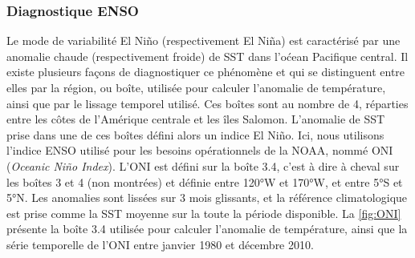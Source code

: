 \documentclass[../main.tex]{subfiles}
\begin{document}


\subsubsection{Diagnostique ENSO}\label{sec:diag_enso}

Le mode de variabilité El Niño (respectivement El Niña) est caractérisé par une anomalie chaude (respectivement froide) de SST dans l'oćean Pacifique central.
Il existe plusieurs façons de diagnostiquer ce phénomène et qui se distinguent entre elles par la région, ou boîte, utilisée pour calculer l'anomalie de
température, ainsi que par le lissage temporel utilisé. Ces boîtes sont au nombre de \num{4}, réparties entre les côtes de l'Amérique centrale et les îles
Salomon. L'anomalie de SST prise dans une de ces boîtes défini alors un indice El Niño. Ici, nous utilisons l'indice ENSO utilisé pour les besoins
opérationnels de la NOAA, nommé ONI (\textit{Oceanic Niño Index}). L'ONI est défini sur la boîte 3.4, c'est à dire à cheval sur les boîtes \num{3} et \num{4}
(non montrées) et définie entre \ang{120}W et \ang{170}W, et entre \ang{5}S et \ang{5}N. Les anomalies sont lissées sur \num{3} mois glissants, et la référence
climatologique est prise comme la SST moyenne sur la toute la période disponible. La \cref{fig:ONI} présente la boîte 3.4 utilisée pour calculer l'anomalie de
température, ainsi que la série temporelle de l'ONI entre janvier \num{1980} et décembre \num{2010}.
\end{document}
